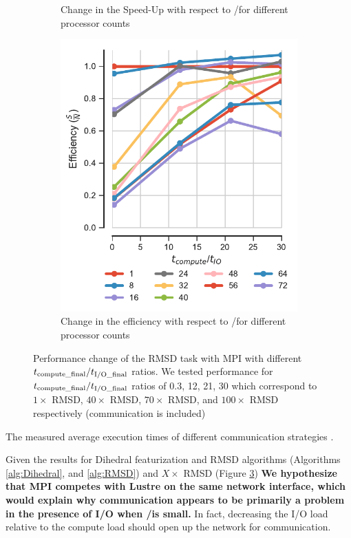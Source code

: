 \begin{figure}
\begin{subfigure}{.3\textwidth}
  \caption{Change in the Speed-Up with respect to \tcomp/\tIO for different processor counts}
  \label{fig:S2_tcomp_tIO_effect}
\end{subfigure}
\hfill
\begin{subfigure}{.3\textwidth}
  \includegraphics[width=\linewidth]{figures/Compute_to_IO_ratio_on_performance_2d_3_v17.pdf}
  \caption{Change in the efficiency with respect to \tcomp/\tIO for different processor counts}
  \label{fig:E_tcomp_tIO_effect}
\end{subfigure}
%
\caption{Performance change of the RMSD task with MPI with different ${t}_{\text{compute\_final}}/{t}_{\text{I/O\_final}}$ ratios. We tested performance for ${t}_{\text{compute\_final}}/{t}_{\text{I/O\_final}}$ ratios of 0.3, 12, 21, 30
which correspond to $1\times$ RMSD, $40\times$ RMSD, $70\times$ RMSD, and $100\times$ RMSD respectively (communication is included)}
\label{fig:tcomp_tIO_effect}
\end{figure}

The measured average execution times of different communication strategies . 

Given the results for Dihedral featurization and RMSD algorithms (Algorithms \ref{alg:Dihedral}, and \ref{alg:RMSD}) and $X\times$ RMSD (Figure \ref{fig:tcomp_tIO_effect})
\textbf{We hypothesize that MPI competes with Lustre on the same network interface, which would explain why communication appears to
  be primarily a problem in the presence of I/O when \tcomp/\tIO is small.}
In fact, decreasing the I/O load relative to the compute load should open up the network for communication. 


